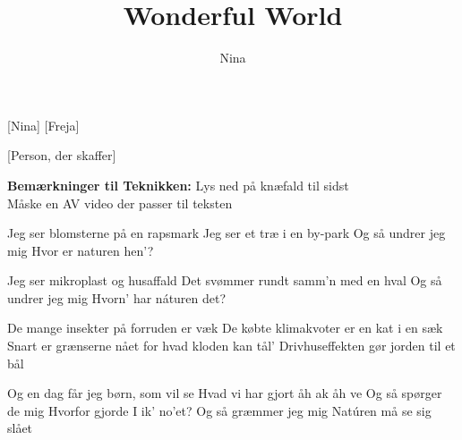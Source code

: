 \documentclass[a4paper,11pt]{article}
\title{Wonderful World}
\author{Nina}
\begin{document}
\maketitle

\begin{roles}
    
[Nina]
[Freja]
\end{roles}

\begin{props}
    [Person, der skaffer]
\end{props}

\textbf{Bemærkninger til Teknikken:} Lys ned på knæfald til sidst \\Måske en AV video der passer til teksten

\begin{song}
   Jeg ser blomsterne \hspace{0.5cm} på en rapsmark  
Jeg ser et træ   \hspace{0.5cm}  i en by-park
Og så undrer jeg mig
Hvor er naturen hen’?

  Jeg ser mikroplast  \hspace{0.5cm}   og husaffald
Det svømmer rundt  \hspace{0.5cm}   samm'n med en hval
Og så undrer jeg mig
Hvorn' har náturen det?

 De mange insekter  \hspace{0.5cm} på forruden er væk
De købte klimakvoter  \hspace{0.5cm}   er en kat i en sæk
Snart er grænserne nået \hspace{0.5cm}  for hvad kloden kan tål’
Drivhuseffekten \hspace{0.5cm}   gør jorden til et bål

Og en dag får jeg  \hspace{0.5cm}   børn, som vil se
Hvad vi har gjort   \hspace{0.5cm}   åh ak åh ve
Og så spørger de mig
Hvorfor gjorde I ik’ no’et?
Og så græmmer jeg mig
Natúren må se sig slået

\end{song}
\end{document}
